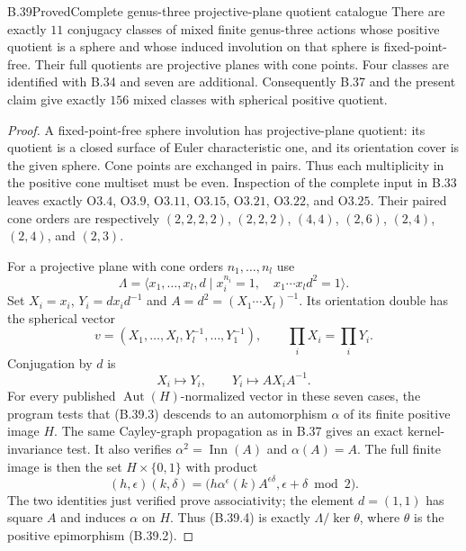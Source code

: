 \begin{claim}{B.39}{Proved}{Complete genus-three projective-plane quotient catalogue}
There are exactly $11$ conjugacy classes of mixed finite genus-three
actions whose positive quotient is a sphere and whose induced
involution on that sphere is fixed-point-free.  Their full quotients
are projective planes with cone points.  Four classes are identified
with B.34 and seven are additional.  Consequently B.37 and the present
claim give exactly $156$ mixed classes with spherical positive quotient.
\end{claim}
\begin{proof}
A fixed-point-free sphere involution has projective-plane quotient:
its quotient is a closed surface of Euler characteristic one, and
its orientation cover is the given sphere.  Cone points are exchanged
in pairs.  Thus each multiplicity in the positive cone multiset must
be even.  Inspection of the complete input in B.33 leaves exactly
$\mathrm O3.4$, $\mathrm O3.9$, $\mathrm O3.11$, $\mathrm O3.15$,
$\mathrm O3.21$, $\mathrm O3.22$, and $\mathrm O3.25$.
Their paired cone orders are respectively
$(2,2,2,2)$, $(2,2,2)$, $(4,4)$, $(2,6)$, $(2,4)$, $(2,4)$,
and $(2,3)$.

For a projective plane with cone orders $n_1,\ldots,n_l$ use
\[
 \Lambda=\langle x_1,\ldots,x_l,d\mid
       x_i^{n_i}=1,\quad x_1\cdots x_l d^2=1\rangle .   \tag{B.39.1}
\]
Set $X_i=x_i$, $Y_i=d x_i d^{-1}$ and
$A=d^2=(X_1\cdots X_l)^{-1}$.  Its orientation double has the
spherical vector
\[
        v=(X_1,\ldots,X_l,Y_l^{-1},\ldots,Y_1^{-1}),
                \qquad\prod_iX_i=\prod_iY_i.            \tag{B.39.2}
\]
Conjugation by $d$ is
\[
       X_i\longmapsto Y_i,\qquad
       Y_i\longmapsto A X_iA^{-1}.                     \tag{B.39.3}
\]
For every published $\operatorname{Aut}(H)$-normalized vector in
these seven cases, the program tests that (B.39.3) descends to an
automorphism $\alpha$ of its finite positive image $H$.  The same
Cayley-graph propagation as in B.37 gives an exact kernel-invariance
test.  It also verifies
$\alpha^2=\operatorname{Inn}(A)$ and $\alpha(A)=A$.
The full finite image is then the set $H\times\{0,1\}$ with product
\[
 (h,\epsilon)(k,\delta)=
       \bigl(h\alpha^\epsilon(k) A^{\epsilon\delta},
                    \epsilon+\delta\bmod2\bigr).      \tag{B.39.4}
\]
The two identities just verified prove associativity; the element
$d=(1,1)$ has square $A$ and induces $\alpha$ on $H$.
Thus (B.39.4) is exactly $\Lambda/\ker\theta$, where
$\theta$ is the positive epimorphism (B.39.2).


\end{proof}
